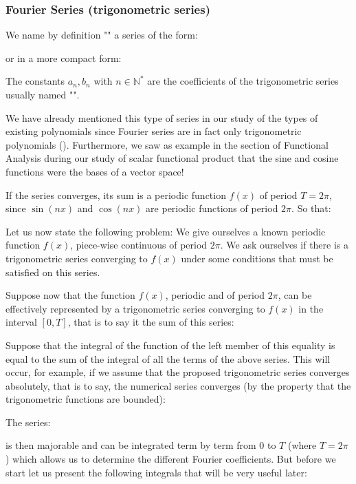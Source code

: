 	\subsubsection{Fourier Series (trigonometric series)}\label{fourier series}
	We name by definition "" a series of the form:
	
	or in a more compact form:
	
	The constants $a_n,b_n$ with $n\in \mathbb{N}^{*}$ are the coefficients of the trigonometric series usually named "".
	
	\begin{tcolorbox}[title=Remark,colframe=black,arc=10pt]
	We have already mentioned this type of series in our study of the types of existing polynomials since Fourier series are in fact only trigonometric polynomials (). Furthermore, we saw as example in the section of Functional Analysis during our study of scalar functional product that the sine and cosine functions were the bases of a vector space!
	\end{tcolorbox}
	If the series converges, its sum is a periodic function $f (x)$ of period $T=2\pi$, since $\sin (nx)$ and $\cos (nx)$ are periodic functions of period $2\pi$. So that:
	
	Let us now state the following problem: We give ourselves a known periodic function $f(x)$, piece-wise continuous of period $2\pi$. We ask ourselves if there is a trigonometric series converging to $f (x)$ under some conditions that must be satisfied on this series.
	
	Suppose now that the function $f (x)$, periodic and of period $2\pi$, can be effectively represented by a trigonometric series converging to $f (x)$ in the interval $[0, T]$, that is to say it the sum of this series:
	
	Suppose that the integral of the function of the left member of this equality is equal to the sum of the integral of all the terms of the above series. This will occur, for example, if we assume that the proposed trigonometric series converges absolutely, that is to say, the numerical series converges (by the property that the trigonometric functions are bounded):
	
	The series:
	
	is then majorable and can be integrated term by term from $0$ to $T$ (where $T=2\pi$) which allows us to determine the different Fourier coefficients. But before we start let us present the following integrals that will be very useful later:
	
